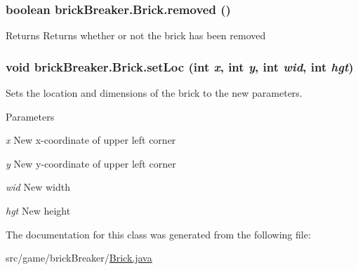 \hypertarget{classbrick_breaker_1_1_brick_ac333dcbd252242dc78ece37b8a661ce0}{
\subsubsection[{removed}]{\setlength{\rightskip}{0pt plus 5cm}boolean brickBreaker.Brick.removed ()}}
\label{classbrick_breaker_1_1_brick_ac333dcbd252242dc78ece37b8a661ce0}
\begin{DoxyReturn}{Returns}
Returns whether or not the brick has been removed 
\end{DoxyReturn}
\hypertarget{classbrick_breaker_1_1_brick_a6f9ff21504eab68a2b9b9e6a87ed0f52}{
\subsubsection[{setLoc}]{\setlength{\rightskip}{0pt plus 5cm}void brickBreaker.Brick.setLoc (int {\em x}, \/  int {\em y}, \/  int {\em wid}, \/  int {\em hgt})}}
\label{classbrick_breaker_1_1_brick_a6f9ff21504eab68a2b9b9e6a87ed0f52}
Sets the location and dimensions of the brick to the new parameters.


\begin{DoxyParams}{Parameters}
\item[{\em x}]New x-\/coordinate of upper left corner \item[{\em y}]New y-\/coordinate of upper left corner \item[{\em wid}]New width \item[{\em hgt}]New height \end{DoxyParams}


The documentation for this class was generated from the following file:\begin{DoxyCompactItemize}
\item 
src/game/brickBreaker/\hyperlink{_brick_8java}{Brick.java}\end{DoxyCompactItemize}
